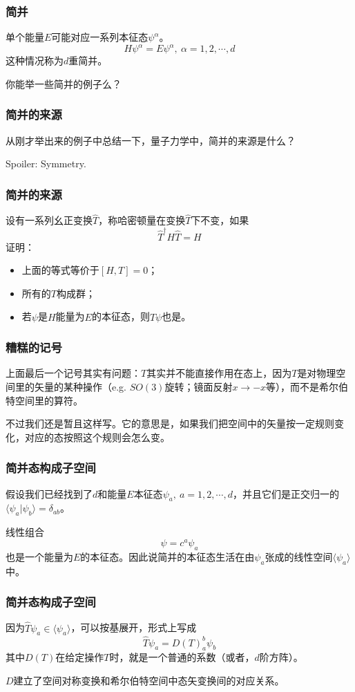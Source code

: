\documentclass[CJK]{beamer}
\begin{document}
\begin{frame}
\frametitle{\bch 简并 \ech}
\bch
单个能量$E$可能对应一系列本征态$\psi^\alpha$。
$$
H \psi^\alpha = E \psi^\alpha ,\ \alpha = 1,2,\cdots , d
$$
这种情况称为$d$重简并。
\par
你能举一些简并的例子么？
\ech
\end{frame}

\begin{frame}
\frametitle{\bch 简并的来源 \ech}
\bch
从刚才举出来的例子中总结一下，量子力学中，简并的来源是什么？
\par
Spoiler: Symmetry.
\ech
\end{frame}

\begin{frame}
\frametitle{\bch 简并的来源 \ech}
\bch
设有一系列幺正变换$\hat T$，称哈密顿量在变换$\hat T$下不变，如果
$$
\hat{T}^\dagger H \hat T = H
$$
证明：
\begin{itemize}
\item 上面的等式等价于$[H,T] = 0$；
\item 所有的$T$构成群；
\item 若$\psi$是$H$能量为$E$的本征态，则$\hat T \psi$也是。
\end{itemize}

\ech
\end{frame}

\begin{frame}
\frametitle{\bch 糟糕的记号 \ech}
\bch
上面最后一个记号其实有问题：$T$其实并不能直接作用在态上，因为$T$是对物理空间里的矢量的某种操作（e.g. $SO(3)$旋转；镜面反射$x \to -x$等），而不是希尔伯特空间里的算符。
\par
不过我们还是暂且这样写。它的意思是，如果我们把空间中的矢量按一定规则变化，对应的态按照这个规则会怎么变。

\ech
\end{frame}

\begin{frame}
\frametitle{\bch 简并态构成子空间 \ech}
\bch
假设我们已经找到了$d$和能量$E$本征态$\psi_a,\ a = 1,2,\cdots,d$，并且它们是正交归一的$\langle \psi_a | \psi_b \rangle = \delta_{ab}$。
\par
线性组合
$$
\psi = c^a \psi_a
$$
也是一个能量为$E$的本征态。因此说简并的本征态生活在由$\psi_a$张成的线性空间$\langle \psi_a \rangle$中。
\ech
\end{frame}


\begin{frame}
\frametitle{\bch 简并态构成子空间 \ech}
\bch
因为$\hat T \psi_a \in \langle \psi_a \rangle$，可以按基展开，形式上写成
$$
\hat T \psi_a = D(T)_a^b \psi_b
$$
其中$D(T)$在给定操作$T$时，就是一个普通的系数（或者，$d$阶方阵）。
\par
$D$建立了空间对称变换和希尔伯特空间中态矢变换间的对应关系。
\ech
\end{frame}
\end{document}
